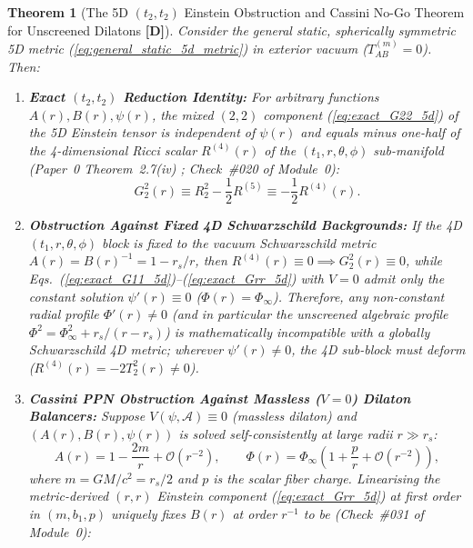 \documentclass[11pt,a4paper]{article}
\newcommand{\catD}{\textbf{\textcolor{blue!75!black}{[D]}}}
\newtheorem{theorem}{Theorem}[section]
\theoremstyle{definition}
\theoremstyle{remark}
\begin{document}
\begin{theorem}[The 5D $(t_2,t_2)$ Einstein Obstruction and Cassini No-Go Theorem for Unscreened Dilatons \catD]
\label{thm:einstein_obstruction}
Consider the general static, spherically symmetric 5D metric (\ref{eq:general_static_5d_metric}) in exterior vacuum ($T_{AB}^{(m)} = 0$). Then:
\begin{enumerate}
  \item[\textnormal{(i)}] \textbf{Exact $(t_2,t_2)$ Reduction Identity:} For arbitrary functions $A(r), B(r), \psi(r)$, the mixed $(2,2)$ component (\ref{eq:exact_G22_5d}) of the 5D Einstein tensor is independent of $\psi(r)$ and equals minus one-half of the 4-dimensional Ricci scalar $R^{(4)}(r)$ of the $(t_1, r, \theta, \phi)$ sub-manifold (Paper~0 Theorem~2.7(iv) \cite{JV_Paper0}; Check~\#020 of Module~0):
  \begin{equation}
    G^2_2(r) \equiv R^2_2 - \frac{1}{2}R^{(5)} \equiv -\frac{1}{2}R^{(4)}(r).
    \label{eq:g22_equals_half_r4}
  \end{equation}
  \item[\textnormal{(ii)}] \textbf{Obstruction Against Fixed 4D Schwarzschild Backgrounds:} If the 4D $(t_1,r,\theta,\phi)$ block is fixed to the vacuum Schwarzschild metric $A(r) = B(r)^{-1} = 1 - r_s/r$, then $R^{(4)}(r) \equiv 0 \implies G^2_2(r) \equiv 0$, while Eqs.~(\ref{eq:exact_G11_5d})--(\ref{eq:exact_Grr_5d}) with $V = 0$ admit only the constant solution $\psi'(r) \equiv 0$ ($\Phi(r) = \Phi_{\infty}$). Therefore, any non-constant radial profile $\Phi'(r) \neq 0$ (and in particular the unscreened algebraic profile $\Phi^2 = \Phi_{\infty}^2 + r_s/(r - r_s)$) is mathematically incompatible with a globally Schwarzschild 4D metric; wherever $\psi'(r) \neq 0$, the 4D sub-block must deform ($R^{(4)}(r) = -2 T^2_2(r) \neq 0$).
  \item[\textnormal{(iii)}] \textbf{Cassini PPN Obstruction Against Massless ($V = 0$) Dilaton Balancers:} Suppose $V(\psi,\mathcal{A}) \equiv 0$ (massless dilaton) and $(A(r), B(r), \psi(r))$ is solved self-consistently at large radii $r \gg r_s$:
  \begin{equation}
    A(r) = 1 - \frac{2m}{r} + \mathcal{O}(r^{-2}), \qquad \Phi(r) = \Phi_{\infty}\left(1 + \frac{p}{r} + \mathcal{O}(r^{-2})\right),
    \label{eq:asymptotic_massless_expansion}
  \end{equation}
  where $m = GM/c^2 = r_s/2$ and $p$ is the scalar fiber charge. Linearising the metric-derived $(r,r)$ Einstein component (\ref{eq:exact_Grr_5d}) at first order in $(m, b_1, p)$ uniquely fixes $B(r)$ at order $r^{-1}$ to be (Check~\#031 of Module~0):

\end{enumerate}
\end{theorem}
\end{document}
